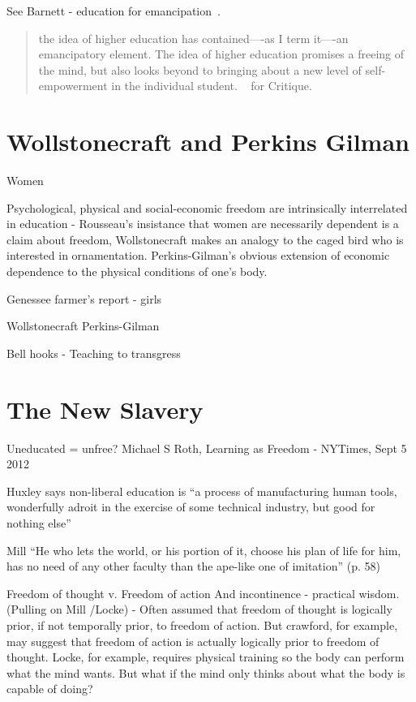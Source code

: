 See Barnett - education for emancipation~\citep{Barnett:1990un}. 

\begin{quote}

the idea of higher education has contained----as I term it----an emancipatory element. The idea of higher education promises a freeing of the mind, but also looks beyond to bringing about a new level of self-empowerment in the individual student. ~\citep[p. X]{White:1997dx} for Critique.
\end{quote}

\section{Wollstonecraft and Perkins Gilman}
\label{wollstonecraftandperkinsgilman}

Women

Psychological, physical and social-economic freedom are intrinsically interrelated in education - Rousseau's insistance that women are necessarily dependent is a claim about freedom, Wollstonecraft makes an analogy to the caged bird who is interested in ornamentation. Perkins-Gilman's obvious extension of economic dependence to the physical conditions of one's body. 

Genessee farmer's report - girls

Wollstonecraft
Perkins-Gilman

Bell hooks - Teaching to transgress

\section{The New Slavery}
\label{thenewslavery}

Uneducated = unfree?
Michael S Roth, Learning as Freedom - NYTimes, Sept 5 2012

Huxley says non-liberal education is ``a process of manufacturing human tools, wonderfully adroit in the exercise of some technical industry, but good for nothing else'' 

Mill ``He who lets the world, or his portion of it, choose his plan of life for him, has no need of any other faculty than the ape-like one of imitation'' (p. 58)

Freedom of thought v. Freedom of action
And incontinence - practical wisdom. (Pulling on Mill \slash  Locke) - Often assumed that freedom of thought is logically prior, if not temporally prior, to freedom of action. But crawford, for example, may suggest that freedom of action is actually logically prior to freedom of thought. Locke, for example, requires physical training so the body can perform what the mind wants. But what if the mind only thinks about what the body is capable of doing?

